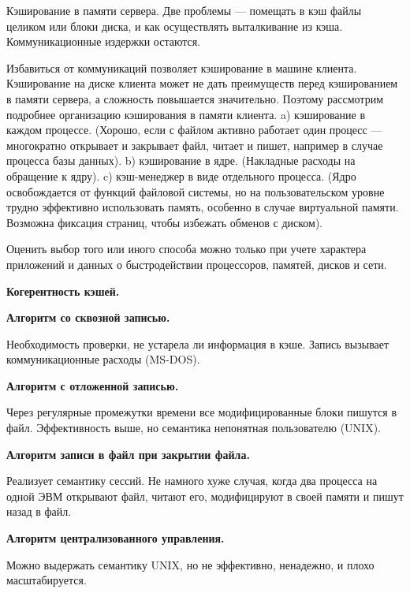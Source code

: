 Кэширование в памяти сервера. 
Две проблемы --- помещать в кэш файлы целиком или блоки диска, и как осуществлять выталкивание из кэша. 
Коммуникационные издержки остаются. 

Избавиться от коммуникаций позволяет кэширование в машине клиента. 
Кэширование на диске клиента может не дать преимуществ перед кэшированием в памяти сервера, а сложность повышается значительно. 
Поэтому рассмотрим подробнее организацию кэширования в памяти клиента. 
a) кэширование в каждом процессе. (Хорошо, если с файлом активно работает один процесс --- многократно открывает и закрывает файл, читает и пишет, например в случае процесса базы данных). 
b) кэширование в ядре. (Накладные расходы на обращение к ядру). 
c) кэш-менеджер в виде отдельного процесса. (Ядро освобождается от функций файловой системы, но на пользовательском уровне трудно эффективно использовать память, особенно в случае виртуальной памяти. Возможна фиксация страниц, чтобы избежать обменов с диском). 

Оценить выбор того или иного способа можно только при учете характера приложений и данных о быстродействии процессоров, памятей, дисков и сети.

\textbf{Когерентность кэшей.} 

\textbf{Алгоритм со сквозной записью.}

Необходимость проверки, не устарела ли информация в кэше. 
Запись вызывает коммуникационные расходы (MS-DOS).

\textbf{Алгоритм с отложенной записью.} 

Через регулярные промежутки времени все модифицированные блоки пишутся в файл.
Эффективность выше, но семантика непонятная пользователю (UNIX).

\textbf{Алгоритм записи в файл при закрытии файла.} 

Реализует семантику сессий. 
Не намного хуже случая, когда два процесса на одной ЭВМ открывают файл, читают
его, модифицируют в своей памяти и пишут назад в файл. 

\textbf{Алгоритм централизованного управления.}

Можно выдержать семантику UNIX, но не эффективно, ненадежно, и плохо масштабируется.

